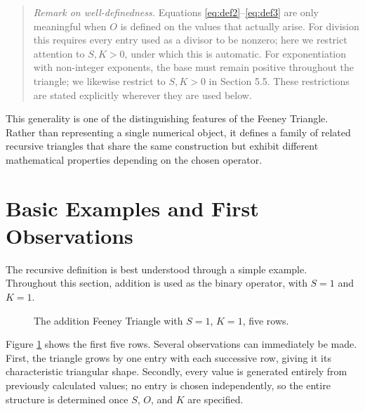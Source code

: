 \documentclass[11pt]{article}
\theoremstyle{definition}
\begin{document}
\begin{quote}
\textit{Remark on well-definedness.} Equations \eqref{eq:def2}--\eqref{eq:def3} are only meaningful when $O$ is defined on the values that actually arise. For division this requires every entry used as a divisor to be nonzero; here we restrict attention to $S,K>0$, under which this is automatic. For exponentiation with non-integer exponents, the base must remain positive throughout the triangle; we likewise restrict to $S,K>0$ in Section 5.5. These restrictions are stated explicitly wherever they are used below.
\end{quote}

This generality is one of the distinguishing features of the Feeney Triangle. Rather than representing a single numerical object, it defines a family of related recursive triangles that share the same construction but exhibit different mathematical properties depending on the chosen operator.

\section{Basic Examples and First Observations}

The recursive definition is best understood through a simple example. Throughout this section, addition is used as the binary operator, with $S=1$ and $K=1$.

\begin{figure}[h]
\centering
{}
\caption{The addition Feeney Triangle with $S=1$, $K=1$, five rows.}
\label{fig:addition-triangle}
\end{figure}

Figure \ref{fig:addition-triangle} shows the first five rows. Several observations can immediately be made. First, the triangle grows by one entry with each successive row, giving it its characteristic triangular shape. Secondly, every value is generated entirely from previously calculated values; no entry is chosen independently, so the entire structure is determined once $S$, $O$, and $K$ are specified.
\end{document}
